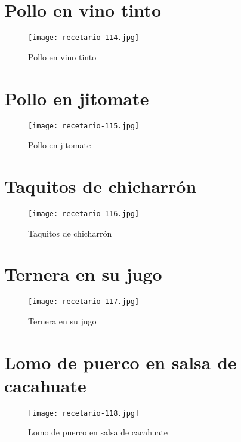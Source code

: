 \documentclass[12pt,letterpaper]{article}
\begin{document}
\section{Pollo en vino tinto}
  \begin{figure}[H]
    \vspace{2pt}
  \texttt{[image: recetario-114.jpg]}
    \caption{Pollo en vino tinto}
    
  \end{figure}

\newpage

\section{Pollo en jitomate}
  \begin{figure}[H]
    \vspace{2pt}
  \texttt{[image: recetario-115.jpg]}
    \caption{Pollo en jitomate}
    
  \end{figure}

\newpage

\section{Taquitos de chicharrón}
  \begin{figure}[H]
    \vspace{2pt}
  \texttt{[image: recetario-116.jpg]}
    \caption{Taquitos de chicharrón}
    
  \end{figure}



\newpage

\section{Ternera en su jugo}
  \begin{figure}[H]
    \vspace{2pt}
  \texttt{[image: recetario-117.jpg]}
    \caption{Ternera en su jugo}
    
  \end{figure}

\newpage

\section{Lomo de puerco en salsa de cacahuate}
  \begin{figure}[H]
    \vspace{2pt}
  \texttt{[image: recetario-118.jpg]}
    \caption{Lomo de puerco en salsa de cacahuate}
    
  \end{figure}
\end{document}
